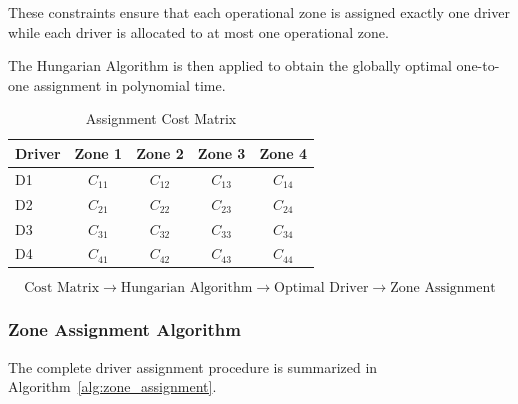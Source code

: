 \documentclass{article}
\begin{document}
These constraints ensure that each operational zone is assigned exactly one driver while each driver is allocated to at most one operational zone.

The Hungarian Algorithm is then applied to obtain the globally optimal one-to-one assignment in polynomial time.

\begin{table}[htbp]
\centering
\caption{Assignment Cost Matrix}
\label{tab:assignment_cost_matrix}
\begin{tabular}{lcccc}
\toprule
\textbf{Driver} & \textbf{Zone 1} & \textbf{Zone 2} & \textbf{Zone 3} & \textbf{Zone 4} \\
\midrule
D1 & $C_{11}$ & $C_{12}$ & $C_{13}$ & $C_{14}$ \\
D2 & $C_{21}$ & $C_{22}$ & $C_{23}$ & $C_{24}$ \\
D3 & $C_{31}$ & $C_{32}$ & $C_{33}$ & $C_{34}$ \\
D4 & $C_{41}$ & $C_{42}$ & $C_{43}$ & $C_{44}$ \\
\bottomrule
\end{tabular}
\end{table}

\[
\text{Cost Matrix} \longrightarrow \text{Hungarian Algorithm} \longrightarrow \text{Optimal Driver}\longrightarrow \text{Zone Assignment}
\]

\subsubsection{Zone Assignment Algorithm}
\label{subsubsec:zone_assignment_algorithm}

The complete driver assignment procedure is summarized in Algorithm~\ref{alg:zone_assignment}.
\end{document}
